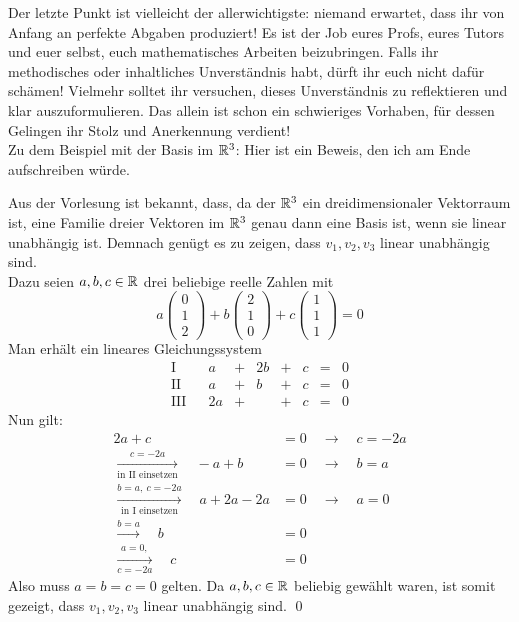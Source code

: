 \begin{de}
\begin{itemize}
 \end{itemize}
 Der letzte Punkt ist vielleicht der allerwichtigste: niemand erwartet, dass ihr von Anfang an perfekte Abgaben produziert! Es ist der Job eures Profs,  eures Tutors und euer selbst, euch mathematisches Arbeiten beizubringen. Falls ihr methodisches oder inhaltliches Unverständnis habt, dürft ihr euch nicht dafür schämen! Vielmehr solltet ihr versuchen, dieses Unverständnis zu reflektieren und klar auszuformulieren. Das allein ist schon ein schwieriges Vorhaben, für dessen Gelingen ihr Stolz und Anerkennung verdient! \\[0.5em]
 Zu dem Beispiel mit der Basis im ${\mathbb R}^3$: Hier ist ein Beweis, den ich am Ende aufschreiben würde.
 \begin{bew}
  Aus der Vorlesung ist bekannt, dass, da der ${\mathbb R}^3$ ein dreidimensionaler Vektorraum ist, eine Familie dreier Vektoren im ${\mathbb R}^3$ genau dann eine Basis ist, wenn sie linear unabhängig ist. Demnach genügt es zu zeigen, dass $v_1,v_2,v_3$ linear unabhängig sind. \\[0.5em]
  Dazu seien $a,b,c\in {\mathbb R}$ drei beliebige reelle Zahlen mit
    \[ a\begin{pmatrix} 0 \\ 1 \\ 2 \end{pmatrix} + b \begin{pmatrix} 2 \\ 1 \\ 0 \end{pmatrix}+c \begin{pmatrix} 1 \\ 1 \\ 1 \end{pmatrix} = 0  \]
Man erhält ein lineares Gleichungssystem
\[  \begin{array}{ccccccccc}
  \text{I} &&    a &+& 2b &+& c &=& 0 \\
  \text{II}&& a &+& b &+& c & =& 0 \\
  \text{III} &&  2a &+& &+ &c & =& 0
  \end{array} \]
  Nun gilt:
  \begin{align*}
   2a+c&=0 \quad \to\quad c = -2a \\
   \xrightarrow[\text{in II einsetzen}]{c=-2a}\quad -a+b &=0 \quad\to\quad b=a \\[0.5em]
   \xrightarrow[\text{in I einsetzen}]{b=a,\ c=-2a} \quad a+2a-2a &= 0 \quad\to\quad a= 0 \\
   \xrightarrow{b=a}\quad b &= 0 \\
   \xrightarrow[c=-2a]{a=0,} \quad c &= 0
  \end{align*}
Also muss $a=b=c=0$ gelten. Da $a,b,c\in {\mathbb R}$ beliebig gewählt waren, ist somit gezeigt, dass $v_1,v_2,v_3$ linear unabhängig sind. \qed
 \end{bew}
 \end{de}
